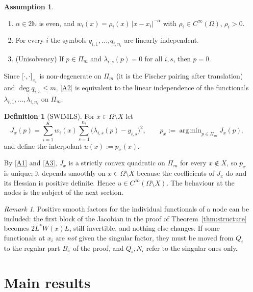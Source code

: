 \documentclass[12pt]{amsart}
\theoremstyle{definition}
\newtheorem{definition}[theorem]{Definition}
\newtheorem{assumption}[theorem]{Assumption}
\theoremstyle{remark}
\newtheorem{remark}[theorem]{Remark}
\newcommand{\N}{\mathbb{N}}
\newcommand{\Pm}{\Pi_m}
\newcommand{\fpz}[3]{\bigl[#1,#2\bigr]_{#3}}     %
\DeclareMathOperator*{\argmin}{arg\,min}
\begin{document}
\begin{assumption}\label{ass:main}
\begin{enumerate}[label=(A\arabic*)]
  \item\label{A1} $\alpha\in2\N$ is even, and $w_i(x)=\rho_i(x)\,|x-x_i|^{-\alpha}$ with
        $\rho_i\in C^\infty(\Omega)$, $\rho_i>0$.
  \item\label{A2} For every $i$ the symbols $q_{i,1},\dots,q_{i,n_i}$ are linearly
        independent.
  \item\label{A3} (Unisolvency) If $p\in\Pm$ and $\lambda_{i,s}(p)=0$ for all $i,s$, then
        $p=0$.
\end{enumerate}
\end{assumption}

Since $\fpz{\cdot}{\cdot}{x_i}$ is non-degenerate on $\Pm$ (it is the Fischer pairing after
translation) and $\deg q_{i,s}\le m$, \ref{A2} is equivalent to the linear independence of the
functionals $\lambda_{i,1},\dots,\lambda_{i,n_i}$ on $\Pm$.

\begin{definition}[SWIMLS]\label{def:swimls}
For $x\in\Omega\setminus X$ let
\begin{equation}\label{eq:functional}
  J_x(p)=\sum_{i=1}^Kw_i(x)\sum_{s=1}^{n_i}\bigl(\lambda_{i,s}(p)-y_{i,s}\bigr)^2,
  \qquad p_x:=\argmin_{p\in\Pm}J_x(p),
\end{equation}
and define the interpolant $u(x):=p_x(x)$.
\end{definition}

By \ref{A1} and \ref{A3}, $J_x$ is a strictly convex quadratic on $\Pm$ for every
$x\notin X$, so $p_x$ is unique; it depends smoothly on $x\in\Omega\setminus X$ because the
coefficients of $J_x$ do and its Hessian is positive definite. Hence $u\in
C^\infty(\Omega\setminus X)$. The behaviour at the nodes is the subject of the next section.

\begin{remark}
Positive smooth factors for the individual functionals of a node can be included: the first
block of the Jacobian in the proof of Theorem~\ref{thm:structure} becomes $2L^*W(x)L$, still
invertible, and nothing else changes. If some functionals at $x_i$ are \emph{not} given the
singular factor, they must be moved from $Q_i$ to the regular part $B_x$ of the proof, and
$Q_i,N_i$ refer to the singular ones only.
\end{remark}

\section{Main results}\label{sec:main}
\end{document}
